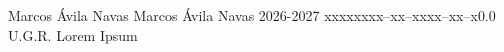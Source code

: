 \documentclass{tstextbook}
\begin{document}
       {Marcos Ávila Navas}
       {Marcos Ávila Navas}
       {2026-2027}
       {xxxxx}{xxx--xx--xxxx--xx--x}{0.0}
       {U.G.R.}
       {Lorem Ipsum}



\begin{code}%
\>[0]\<%
\\
\>[0]\AgdaSpace{}%
\AgdaSpace{}%
\<%
\\
%
\\[\AgdaEmptyExtraSkip]%
\>[0]\<%
\end{code}
\end{document}
